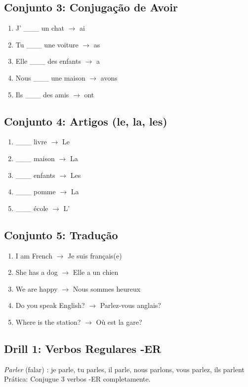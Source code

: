 \documentclass[a4paper,12pt]{article}
\begin{document}
\subsection{Conjunto 3: Conjugação de Avoir}
\begin{enumerate}
    \item J’ \_\_\_ un chat $\to$ ai
    \item Tu \_\_\_ une voiture $\to$ as
    \item Elle \_\_\_ des enfants $\to$ a
    \item Nous \_\_\_ une maison $\to$ avons
    \item Ils \_\_\_ des amis $\to$ ont
\end{enumerate}

\subsection{Conjunto 4: Artigos (le, la, les)}
\begin{enumerate}
    \item \_\_\_ livre $\to$ Le
    \item \_\_\_ maison $\to$ La
    \item \_\_\_ enfants $\to$ Les
    \item \_\_\_ pomme $\to$ La
    \item \_\_\_ école $\to$ L’
\end{enumerate}

\subsection{Conjunto 5: Tradução}
\begin{enumerate}
    \item I am French $\to$ Je suis français(e)
    \item She has a dog $\to$ Elle a un chien
    \item We are happy $\to$ Nous sommes heureux
    \item Do you speak English? $\to$ Parlez-vous anglais?
    \item Where is the station? $\to$ Où est la gare?
\end{enumerate}

\subsection{Drill 1: Verbos Regulares -ER}
\emph{Parler} (falar) : je parle, tu parles, il parle, nous parlons, vous parlez, ils parlent \\
Prática: Conjugue 3 verbos -ER completamente.
\end{document}

